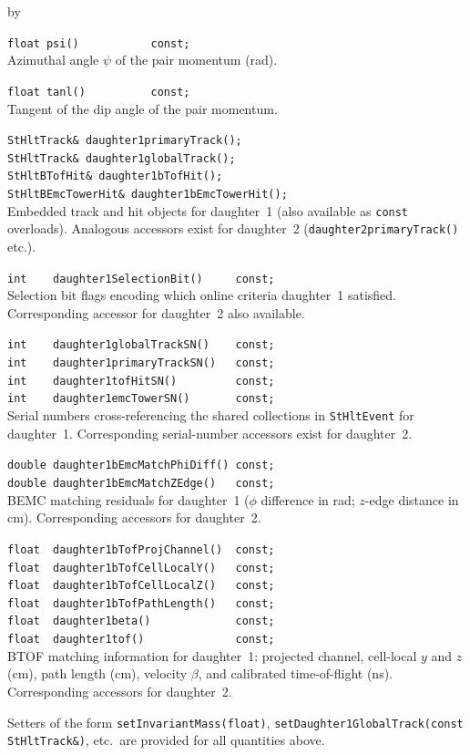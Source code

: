 \documentclass[twoside]{article}
\newcommand{\entrylabel}[1]{\mbox{\textbf{{#1}}}\hfil}%
\newenvironment{entry}
{\begin{list}{}%
    {\renewcommand{\makelabel}{\entrylabel}%
     \setlength{\labelwidth}{90pt}%
     \setlength{\leftmargin}{\labelwidth}
     \advance\leftmargin by \labelsep%
      }%
    }%
  {\end{list}}
\newcommand{\Entrylabel}[1]%
{\raisebox{0pt}[1ex][0pt]{\makebox[\labelwidth][l]%
    {\parbox[t]{\labelwidth}{\hspace{0pt}\textbf{{#1}}}}}}
\newenvironment{Entry}%
{\renewcommand{\entrylabel}{\Entrylabel}\begin{entry}}%
  {\end{entry}}
\begin{document}
\begin{Entry}
    \verb+float psi()           const;+\\
    Azimuthal angle $\psi$ of the pair momentum (rad).

    \verb+float tanl()          const;+\\
    Tangent of the dip angle of the pair momentum.

    \verb+StHltTrack& daughter1primaryTrack();+\\
    \verb+StHltTrack& daughter1globalTrack();+\\
    \verb+StHltBTofHit& daughter1bTofHit();+\\
    \verb+StHltBEmcTowerHit& daughter1bEmcTowerHit();+\\
    Embedded track and hit objects for daughter~1 (also available as
    \texttt{const} overloads).  Analogous accessors exist for
    daughter~2 (\texttt{daughter2primaryTrack()} etc.).

    \verb+int    daughter1SelectionBit()     const;+\\
    Selection bit flags encoding which online criteria daughter~1
    satisfied.  Corresponding accessor for daughter~2 also available.

    \verb+int    daughter1globalTrackSN()    const;+\\
    \verb+int    daughter1primaryTrackSN()   const;+\\
    \verb+int    daughter1tofHitSN()         const;+\\
    \verb+int    daughter1emcTowerSN()       const;+\\
    Serial numbers cross-referencing the shared collections in
    \texttt{StHltEvent} for daughter~1.  Corresponding serial-number
    accessors exist for daughter~2.

    \verb+double daughter1bEmcMatchPhiDiff() const;+\\
    \verb+double daughter1bEmcMatchZEdge()   const;+\\
    BEMC matching residuals for daughter~1 ($\phi$ difference in rad;
    $z$-edge distance in cm).  Corresponding accessors for daughter~2.

    \verb+float  daughter1bTofProjChannel()  const;+\\
    \verb+float  daughter1bTofCellLocalY()   const;+\\
    \verb+float  daughter1bTofCellLocalZ()   const;+\\
    \verb+float  daughter1bTofPathLength()   const;+\\
    \verb+float  daughter1beta()             const;+\\
    \verb+float  daughter1tof()              const;+\\
    BTOF matching information for daughter~1: projected channel,
    cell-local $y$ and $z$ (cm), path length (cm), velocity $\beta$,
    and calibrated time-of-flight (ns).  Corresponding accessors for
    daughter~2.

    Setters of the form \verb+setInvariantMass(float)+,
    \verb+setDaughter1GlobalTrack(const StHltTrack&)+, etc.\ are
    provided for all quantities above.
\end{Entry}
\clearpage
\end{document}
